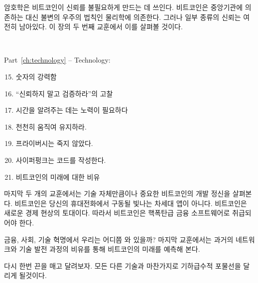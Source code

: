\begin{comment}
	Cryptography is what Bitcoin uses to remove trust in authorities.
	Instead of relying on centralized institutions, the system relies on the final
	authority of our universe: physics. Some grains of trust still remain, however.
	We will examine these grains in the second lesson of this chapter.
\end{comment}
암호학은 비트코인이 신뢰를 불필요하게 만드는 데 쓰인다.
비트코인은 중앙기관에 의존하는 대신 불변의 우주의 법칙인 물리학에 의존한다.
그러나 일부 종류의 신뢰는 여전히 남아있다.
이 장의 두 번째 교훈에서 이를 살펴볼 것이다.

~

\begin{samepage}
	Part~\ref{ch:technology} -- Technology:
	
	\begin{enumerate}
		\setcounter{enumi}{14}
		\item 숫자의 강력함
		\item \enquote{신뢰하지 말고 검증하라}의 고찰
		\item 시간을 알려주는 데는 노력이 필요하다
		\item 천천히 움직여 유지하라.
		\item 프라이버시는 죽지 않았다.
		\item 사이퍼펑크는 코드를 작성한다.
		\item 비트코인의 미래에 대한 비유
	\end{enumerate}
\end{samepage}

\begin{comment}
	The last couple of lessons explore the ethos of technological development in
	Bitcoin, which is arguably as important as the technology itself. Bitcoin is not
	the next shiny app on your phone. It is the foundation of a new economic
	reality, which is why Bitcoin should be treated as nuclear-grade financial
	software.
\end{comment}
마지막 두 개의 교훈에서는 기술 자체만큼이나 중요한 비트코인의 개발 정신을 살펴본다.
비트코인은 당신의 휴대전화에서 구동될 빛나는 차세대 앱이 아니다.
비트코인은 새로운 경제 현상의 토대이다. 
따라서 비트코인은 핵폭탄급 금융 소프트웨어로 취급되어야 한다.

\begin{comment}
	Where are we in this financial, societal, and technological revolution? 
	
	Networks and technologies of the past may serve as metaphors for Bitcoin's future, which
	are explored in the last lesson of this chapter.
\end{comment}
금융, 사회, 기술 혁명에서 우리는 어디쯤 와 있을까?
마지막 교훈에서는 과거의 네트워크와 기술 발전 과정의 비유를 통해 비트코인의 미래를 예측해 본다.

\begin{comment}
	Once more, strap in and enjoy the ride. Like all exponential technologies, we
	are about to go parabolic.
\end{comment}
다시 한번 끈을 매고 달려보자. 모든 다른 기술과 마찬가지로 기하급수적 포물선을 달리게 될것이다.
